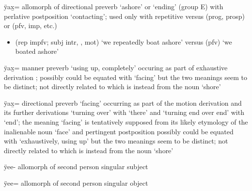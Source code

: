 \begin{morphdesc}[resume*=alphalist]
\item[ÿax̱=]\label{m:ÿax̱=ashore}
	allomorph of directional preverb  ‘ashore’ or ‘ending’ (group E)
	with perlative postposition  ‘contacting’;
	used only with repetitive versus  (prog, prosp) or  (pfv, imp, etc.)
	\begin{itemize}
	\item	{} (rep impfv; subj intr, , mot) ‘we repeatedly boat ashore’\newline
		versus  (pfv) ‘we boated ashore’
	\end{itemize}

\item[ÿax̱=]\label{m:ÿax̱=exh}
	manner preverb ‘using up, completely’ occuring as part of exhaustive derivation
		;
	possibly could be equated with  ‘facing’
		but the two meanings seem to be distinct;
	not directly related to  which is instead from the noun  ‘shore’

\item[ÿax̱=]\label{m:ÿax̱=facing}
	directional preverb ‘facing’ occurring as part of the motion derivation
		and its further derivations  ‘turning over’ with  ‘there’
		and  ‘turning end over end’ with  ‘end’;
	the meaning ‘facing’ is tentatively supposed from its likely etymology of
		the inalienable noun  ‘face’ and pertingent postposition 
	possibly could be equated with  ‘exhaustively, using up’
		but the two meanings seem to be distinct;
	not directly related to  which is instead from the noun  ‘shore’

\item[ÿee-]
	allomorph of second person singular subject 

\item[ÿee=]
	allomorph of second person singular object 


\end{morphdesc}
